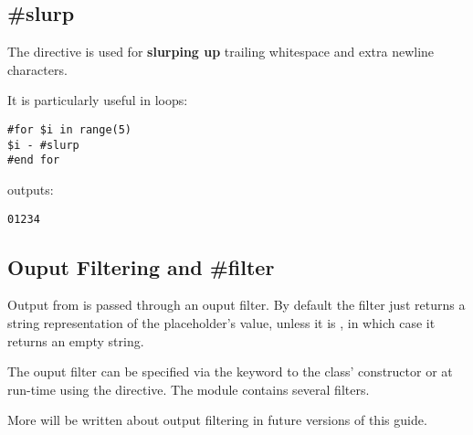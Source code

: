\subsection{\#slurp}
\label{output.slurp}

The  directive is used for {\bf slurping up} trailing whitespace
and extra newline characters.


It is particularly useful in  loops:
\begin{verbatim}
#for $i in range(5)
$i - #slurp
#end for
\end{verbatim}
outputs:
\begin{verbatim}
01234
\end{verbatim}


\subsection{Ouput Filtering and \#filter}
\label{output.filter}

Output from  is passed through an ouput filter.  By default
the filter just returns a string representation of the placeholder's value,
unless it is , in which case it returns an empty string. 

The ouput filter can be specified via the  keyword to the
 class' constructor or at run-time using the 
directive. The  module contains several filters.

More will be written about output filtering in future versions of this guide.



